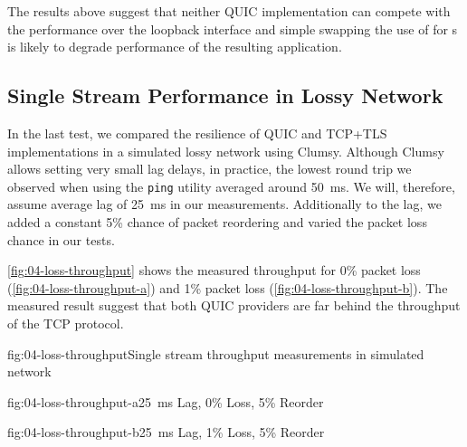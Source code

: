 The results above suggest that neither QUIC implementation can compete with the \SslStream{}
performance over the loopback interface and simple swapping the use of \SslStream{} for
\QuicStream{}s is likely to degrade performance of the resulting application.

\subsection{Single Stream Performance in Lossy Network}


In the last test, we compared the resilience of QUIC and TCP+TLS implementations in a simulated
lossy network using Clumsy. Although Clumsy allows setting very small lag delays, in practice, the
lowest round trip we observed when using the \texttt{ping} utility averaged around
\SI{50}{\milli\second}. We will, therefore, assume average lag of \SI{25}{\milli\second} in our
measurements. Additionally to the lag, we added a constant 5\% chance of packet reordering and
varied the packet loss chance in our tests.




\autoref{fig:04-loss-throughput} shows the measured throughput for 0\% packet loss
(\autoref{fig:04-loss-throughput-a}) and 1\% packet loss (\autoref{fig:04-loss-throughput-b}). The
measured result suggest that both QUIC providers are far behind the throughput of the TCP protocol.

\begin{myFigure}{fig:04-loss-throughput}{Single stream throughput measurements in simulated network}
\begin{mySubfigure}{0.49\linewidth}{fig:04-loss-throughput-a}{\SI{25}{\milli\second} Lag, 0\% Loss, 5\% Reorder}
\footnotesize

\end{mySubfigure}
\begin{mySubfigure}{0.49\linewidth}{fig:04-loss-throughput-b}{\SI{25}{\milli\second} Lag, 1\% Loss, 5\% Reorder}
\footnotesize

\end{mySubfigure}
\end{myFigure}

